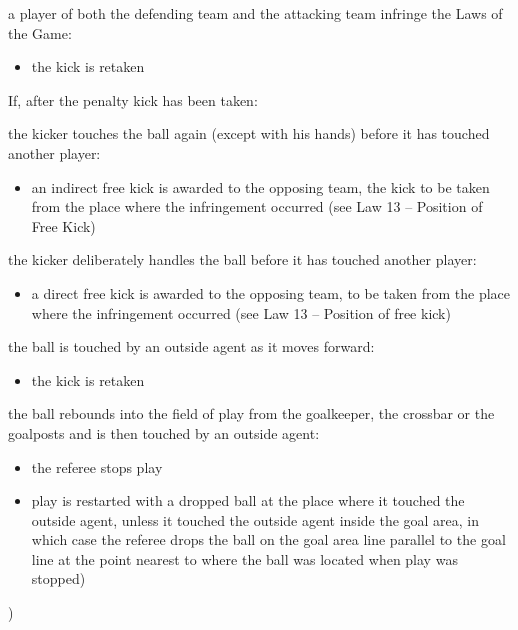 {\bigskip

a player of both the defending team and the attacking team infringe the
Laws of the Game:

\begin{itemize}
\item the kick is retaken
\end{itemize}

\bigskip

If, after the penalty kick has been taken:

the kicker touches the ball again (except with his hands) before it has
touched another player:

\begin{itemize}
\item an indirect free kick is awarded to the opposing team, the kick to be
taken from the place where the infringement occurred (see Law 13 --
Position of Free Kick)
\end{itemize}

\bigskip

the kicker deliberately handles the ball before it has touched another
player:

\begin{itemize}
\item a direct free kick is awarded to the opposing team, to be taken from the
place where the infringement occurred (see Law 13 -- Position of free
kick)
\end{itemize}

\bigskip

the ball is touched by an outside agent as it moves forward:

\begin{itemize}
\item the kick is retaken
\end{itemize}

\bigskip

the ball rebounds into the field of play from the goalkeeper, the
crossbar or the goalposts and is then touched by an outside agent:

\begin{itemize}
\item the referee stops play
\item play is restarted with a dropped ball at the place where it touched the
outside agent, unless it touched the outside agent inside the goal area,
in which case the referee drops the ball on the goal area line parallel
to the goal line at the point nearest to where the ball was located
when play was stopped)
\end{itemize}
)}
\color{black}
